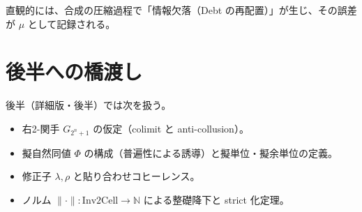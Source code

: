 \documentclass[a4paper,11pt]{article}
\begin{document}
\begin{remark}
直観的には、合成の圧縮過程で「情報欠落（Debt の再配置）」が生じ、その誤差が $\mu$ として記録される。
\end{remark}

\section{後半への橋渡し}
後半（詳細版・後半）では次を扱う。
\begin{itemize}
  \item 右2-関手 $G_{2^n+1}$ の仮定（colimit と anti-collusion）。
  \item 擬自然同値 $\Phi$ の構成（普遍性による誘導）と擬単位・擬余単位の定義。
  \item 修正子 $\lambda,\rho$ と貼り合わせコヒーレンス。
  \item ノルム $\|\cdot\|:\mathrm{Inv2Cell}\to\mathbb{N}$ による整礎降下と strict 化定理。
\end{itemize}
\end{document}
